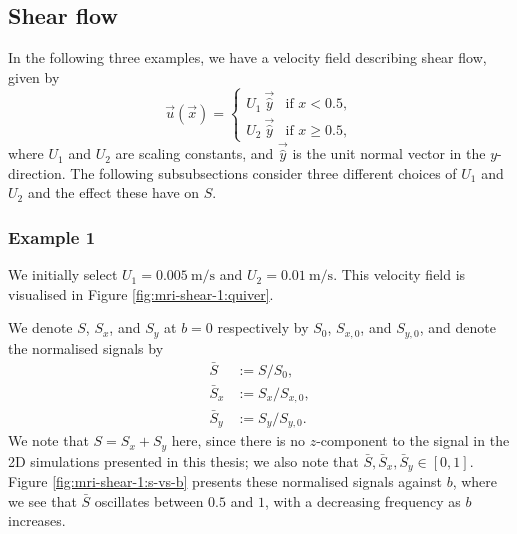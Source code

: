         \subsection{Shear flow} \label{sec:numerical-mri:manufactured:shear}
            In the following three examples, we have a velocity field describing shear flow, given by
            \begin{equation}
                \vec{u}(\vec{x}) =
                \begin{cases}
                    U_1 ~ \vec{\hat{y}} & \text{if } x < 0.5, \\
                    U_2 ~ \vec{\hat{y}} & \text{if } x \geq 0.5,
                \end{cases}
            \end{equation}
            where $U_1$ and $U_2$ are scaling constants, and $\vec{\hat{y}}$ is the unit normal vector in the $y$-direction. The following subsubsections consider three different choices of $U_1$ and $U_2$ and the effect these have on $S$.

            \subsubsection{Example 1} \label{sec:numerical-mri:manufactured:shear:1}
                We initially select $U_1 = \qty{0.005}{\metre\per\second}$ and $U_2 = \qty{0.01}{\metre\per\second}$. This velocity field is visualised in Figure \ref{fig:mri-shear-1:quiver}.

                We denote $S$, $S_x$, and $S_y$ at $b=0$ respectively by $S_0$, $S_{x,0}$, and $S_{y,0}$, and denote the normalised signals by
                \begin{subequations}
                    \begin{align}
                        \bar{S} & := S/S_0, \\
                        \bar{S}_x & := S_x/S_{x,0}, \\
                        \bar{S}_y & := S_y/S_{y,0}.
                    \end{align}
                \end{subequations}
                We note that $S = S_x + S_y$ here, since there is no $z$-component to the signal in the 2D simulations presented in this thesis; we also note that $\bar{S}, \bar{S}_x, \bar{S}_y \in [0, 1]$. Figure \ref{fig:mri-shear-1:s-vs-b} presents these normalised signals against $b$, where we see that $\bar{S}$ oscillates between $0.5$ and $1$, with a decreasing frequency as $b$ increases.

